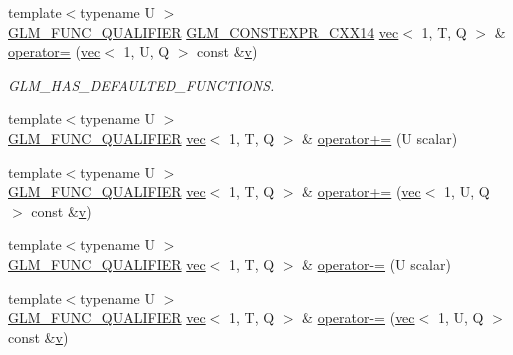 \begin{DoxyCompactItemize}
\item 
{\footnotesize template$<$typename U $>$ }\\\hyperlink{setup_8hpp_a33fdea6f91c5f834105f7415e2a64407}{G\+L\+M\+\_\+\+F\+U\+N\+C\+\_\+\+Q\+U\+A\+L\+I\+F\+I\+ER} \hyperlink{setup_8hpp_a4dd12abf5e1164bc57f3a34671d03844}{G\+L\+M\+\_\+\+C\+O\+N\+S\+T\+E\+X\+P\+R\+\_\+\+C\+X\+X14} \hyperlink{structglm_1_1vec}{vec}$<$ 1, T, Q $>$ \& \hyperlink{structglm_1_1vec_3_011_00_01_t_00_01_q_01_4_a5b41960ee625ae1959386beea2e587f2}{operator=} (\hyperlink{structglm_1_1vec}{vec}$<$ 1, U, Q $>$ const \&\hyperlink{_s_d_l__opengl_8h_a10a82eabcb59d2fcd74acee063775f90}{v})
\begin{DoxyCompactList}\small\item\em G\+L\+M\+\_\+\+H\+A\+S\+\_\+\+D\+E\+F\+A\+U\+L\+T\+E\+D\+\_\+\+F\+U\+N\+C\+T\+I\+O\+NS. \end{DoxyCompactList}\item 
{\footnotesize template$<$typename U $>$ }\\\hyperlink{setup_8hpp_a33fdea6f91c5f834105f7415e2a64407}{G\+L\+M\+\_\+\+F\+U\+N\+C\+\_\+\+Q\+U\+A\+L\+I\+F\+I\+ER} \hyperlink{structglm_1_1vec}{vec}$<$ 1, T, Q $>$ \& \hyperlink{structglm_1_1vec_3_011_00_01_t_00_01_q_01_4_aefbc9c1c018abcb5c7e6ebe8c1d1fc1f}{operator+=} (U scalar)
\item 
{\footnotesize template$<$typename U $>$ }\\\hyperlink{setup_8hpp_a33fdea6f91c5f834105f7415e2a64407}{G\+L\+M\+\_\+\+F\+U\+N\+C\+\_\+\+Q\+U\+A\+L\+I\+F\+I\+ER} \hyperlink{structglm_1_1vec}{vec}$<$ 1, T, Q $>$ \& \hyperlink{structglm_1_1vec_3_011_00_01_t_00_01_q_01_4_a6af79bf388e7df43ec8935271207d6fc}{operator+=} (\hyperlink{structglm_1_1vec}{vec}$<$ 1, U, Q $>$ const \&\hyperlink{_s_d_l__opengl_8h_a10a82eabcb59d2fcd74acee063775f90}{v})
\item 
{\footnotesize template$<$typename U $>$ }\\\hyperlink{setup_8hpp_a33fdea6f91c5f834105f7415e2a64407}{G\+L\+M\+\_\+\+F\+U\+N\+C\+\_\+\+Q\+U\+A\+L\+I\+F\+I\+ER} \hyperlink{structglm_1_1vec}{vec}$<$ 1, T, Q $>$ \& \hyperlink{structglm_1_1vec_3_011_00_01_t_00_01_q_01_4_ad8f1f7c45247e319031b4763b1b5d8e5}{operator-\/=} (U scalar)
\item 
{\footnotesize template$<$typename U $>$ }\\\hyperlink{setup_8hpp_a33fdea6f91c5f834105f7415e2a64407}{G\+L\+M\+\_\+\+F\+U\+N\+C\+\_\+\+Q\+U\+A\+L\+I\+F\+I\+ER} \hyperlink{structglm_1_1vec}{vec}$<$ 1, T, Q $>$ \& \hyperlink{structglm_1_1vec_3_011_00_01_t_00_01_q_01_4_af7f71fdf4777a81e3c86efae282ca96e}{operator-\/=} (\hyperlink{structglm_1_1vec}{vec}$<$ 1, U, Q $>$ const \&\hyperlink{_s_d_l__opengl_8h_a10a82eabcb59d2fcd74acee063775f90}{v})

\end{DoxyCompactItemize}
